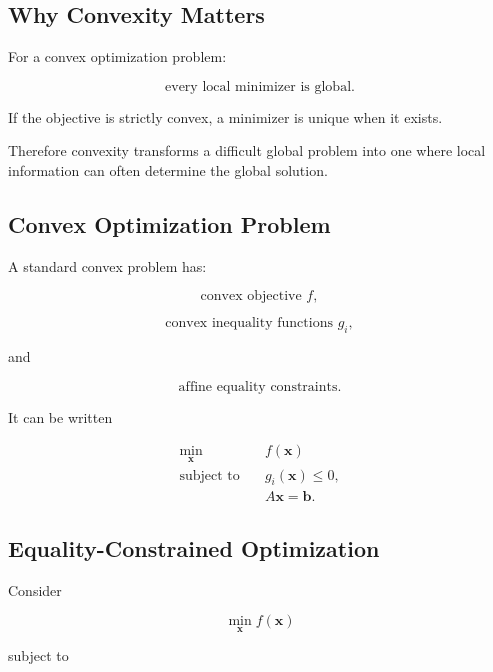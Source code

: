 \subsection{Why Convexity Matters}
\label{subsec:why-convexity-matters}

For a convex optimization problem:

\[
\boxed{
\text{every local minimizer is global}.
}
\]

If the objective is strictly convex, a minimizer is unique when it
exists.

Therefore convexity transforms a difficult global problem into one where
local information can often determine the global solution.

\subsection{Convex Optimization Problem}
\label{subsec:convex-optimization-problem}

A standard convex problem has:

\[
\boxed{
\text{convex objective }f,
}
\]

\[
\boxed{
\text{convex inequality functions }g_i,
}
\]

and

\[
\boxed{
\text{affine equality constraints}.
}
\]

It can be written

\[
\boxed{
\begin{aligned}
\min_{\mathbf{x}}
\quad&
f(\mathbf{x})
\\
\text{subject to}
\quad&
g_i(\mathbf{x})\leq0,
\\
&
A\mathbf{x}=\mathbf{b}.
\end{aligned}
}
\]

\subsection{Equality-Constrained Optimization}
\label{subsec:equality-constrained-optimization}

Consider

\[
\boxed{
\min_{\mathbf{x}}
f(\mathbf{x})
}
\]

subject to

